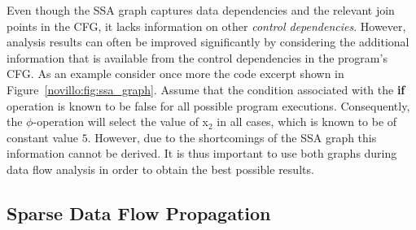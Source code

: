 Even though the SSA graph captures data dependencies and the relevant join
points in the CFG, it lacks information on other
\emph{control dependencies}. However, analysis results can often be improved
significantly by considering the additional information that is available from
the control dependencies in the program's CFG. As an example consider once more
the code excerpt shown in Figure~\ref{novillo:fig:ssa_graph}. Assume that the
condition associated with the \textbf{if} operation is known to be false for all
possible program executions. Consequently, the $\phi$-operation will select the
value of x$_2$ in all cases, which is known to be of constant value $5$.
However, due to the shortcomings of the SSA graph this information cannot be
derived. It is thus important to use both graphs during data flow analysis
in order to obtain the best possible results.

\subsection{Sparse Data Flow Propagation}


